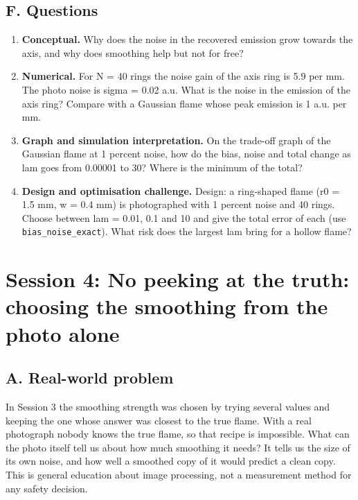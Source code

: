 \documentclass[11pt,a4paper]{article}
\begin{document}
\subsection*{F. Questions}
\begin{enumerate}[nosep]
\item \textbf{Conceptual.} Why does the noise in the recovered emission grow towards the axis, and why does smoothing help but not for free?
\item \textbf{Numerical.} For N = 40 rings the noise gain of the axis ring is 5.9 per mm. The photo noise is sigma = 0.02 a.u. What is the noise in the emission of the axis ring? Compare with a Gaussian flame whose peak emission is 1 a.u. per mm.
\item \textbf{Graph and simulation interpretation.} On the trade-off graph of the Gaussian flame at 1 percent noise, how do the bias, noise and total change as lam goes from 0.00001 to 30? Where is the minimum of the total?
\item \textbf{Design and optimisation challenge.} Design: a ring-shaped flame (r0 = 1.5 mm, w = 0.4 mm) is photographed with 1 percent noise and 40 rings. Choose between lam = 0.01, 0.1 and 10 and give the total error of each (use \texttt{bias\_noise\_exact}). What risk does the largest lam bring for a hollow flame?
\end{enumerate}

\section{Session 4: No peeking at the truth: choosing the smoothing from the photo alone}

\subsection*{A. Real-world problem}
In Session 3 the smoothing strength was chosen by trying several values and keeping the one whose answer was closest to the true flame. With a real photograph nobody knows the true flame, so that recipe is impossible. What can the photo itself tell us about how much smoothing it needs? It tells us the size of its own noise, and how well a smoothed copy of it would predict a clean copy. This is general education about image processing, not a measurement method for any safety decision.
\end{document}
